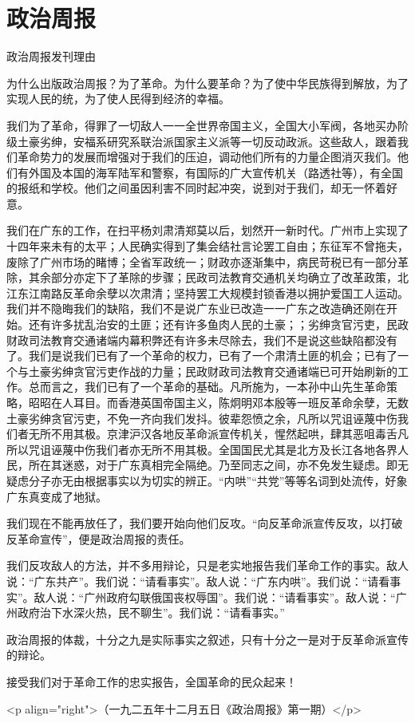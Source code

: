 \section[政治周报]{政治周报}


政治周报发刊理由

为什么出版政治周报？为了革命。为什么要革命？为了使中华民族得到解放，为了实现人民的统，为了使人民得到经济的幸福。

我们为了革命，得罪了一切敌人一一全世界帝国主义，全国大小军阀，各地买办阶级土豪劣绅，安福系研究系联治派国家主义派等一切反动政派。这些敌人，跟着我们革命势力的发展而增强对于我们的压迫，调动他们所有的力量企图消灭我们。他们有外国及本国的海军陆军和警察，有国际的广大宣传机关（路透社等），有全国的报纸和学校。他们之间虽因利害不同时起冲突，说到对于我们，却无一怀着好意。

我们在广东的工作，在扫平杨刘肃清郑莫以后，划然开一新时代。广州市上实现了十四年来未有的太平；人民确实得到了集会结社言论罢工自由；东征军不曾拖夫，废除了广州市场的睹博；全省军政统一；财政亦逐渐集中，病民苛税已有一部分革除，其余部分亦定下了革除的步骤；民政司法教育交通机关均确立了改革政策，北江东江南路反革命余孽以次肃清；坚持罢工大规模封锁香港以拥护爱国工人运动。我们并不隐晦我们的缺陷，我们不是说广东业已改造一一广东之改造确还刚在开始。还有许多扰乱治安的土匪；还有许多鱼肉人民的土豪；；劣绅贪官污吏，民政财政司法教育交通诸端内幕积弊还有许多未尽除去，我们不是说这些缺陷都没有了。我们是说我们已有了一个革命的权力，已有了一个肃清土匪的机会；已有了一个与土豪劣绅贪官污吏作战的力量；民政财政司法教育交通诸端已可开始刷新的工作。总而言之，我们已有了一个革命的基础。凡所施为，一本孙中山先生革命策略，昭昭在人耳目。而香港英国帝国主义，陈炯明邓本殷等一班反革命余孽，无数土豪劣绅贪官污吏，不免一齐向我们发抖。彼辈怨愤之余，凡所以咒诅诬蔑中伤我们者无所不用其极。京津沪汉各地反革命派宣传机关，惺然起哄，肆其恶咀毒舌凡所以咒诅诬蔑中伤我们者亦无所不用其极。全国国民尤其是北方及长江各地各界人民，所在其迷惑，对于广东真相完全隔绝。乃至同志之间，亦不免发生疑虑。即无疑虑分子亦无由根据事实以为切实的辨正。“内哄”“共党”等等名词到处流传，好象广东真变成了地狱。

我们现在不能再放任了，我们要开始向他们反攻。“向反革命派宣传反攻，以打破反革命宣传”，便是政治周报的责任。

我们反攻敌人的方法，并不多用辩论，只是老实地报告我们革命工作的事实。敌人说：“广东共产”。我们说：“请看事实”。敌人说：“广东内哄”。我们说：“请看事实”。敌人说：“广州政府勾联俄国丧权辱国”。我们说：“请看事实”。敌人说：“广州政府治下水深火热，民不聊生”。我们说：“请看事实。”

政治周报的体裁，十分之九是实际事实之叙述，只有十分之一是对于反革命派宣传的辩论。

接受我们对于革命工作的忠实报告，全国革命的民众起来！

<p align="right">（一九二五年十二月五日《政治周报》第一期）</p>


